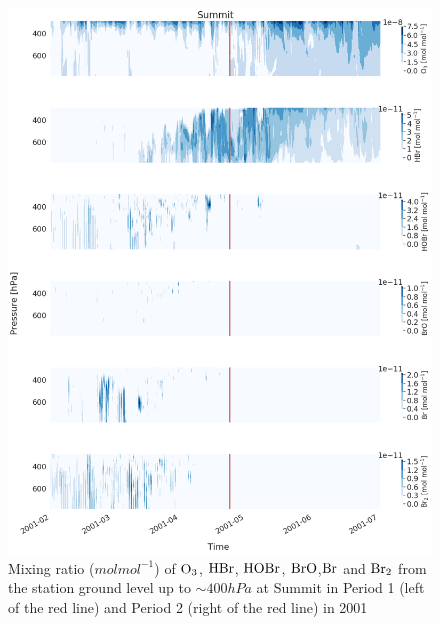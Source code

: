 \begin{figure}[h]
    \centering
    \includegraphics[width=\linewidth]{Chapter6_Results/images/Vert_StationComp_2001/vert_all_species_SUM.png}
    \caption{Mixing ratio ($mol mol^{-1}$) of $\mathrm{O_3}$, $\mathrm{HBr}$, $\mathrm{HOBr}$, $\mathrm{BrO}$,$\mathrm{Br}$ and $\mathrm{Br_2}$ from the station ground level up to $\sim 400 hPa$ at Summit in Period 1 (left of the red line) and Period 2 (right of the red line) in 2001}
    \label{fig:vert_SUM}
\end{figure}